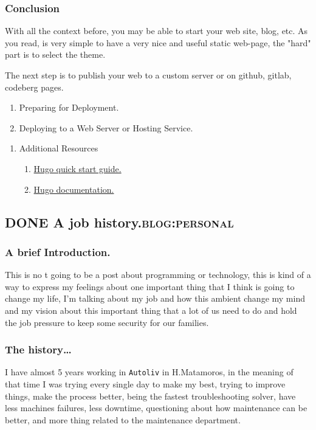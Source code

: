 \documentclass[11pt]{article}
\begin{document}
\subsubsection{Conclusion}
\label{sec:org67b39a6}
With all the context before, you may be able to start your web site, blog, etc. As you read, is very simple to have a very nice and useful static web-page, the "hard" part is to select the theme.

The next step is to publish your web to a custom server or on github, gitlab, codeberg pages.
\begin{enumerate}
\item Preparing for Deployment.
\item Deploying to a Web Server or Hosting Service.
\end{enumerate}
\begin{enumerate}
\item Additional Resources
\label{sec:orgf3ee645}
\begin{enumerate}
\item \href{https://gohugo.io/getting-started/quick-start/}{Hugo quick start guide.}
\item \href{https://gohugo.io/documentation/}{Hugo documentation.}
\end{enumerate}
\end{enumerate}
\subsection{{\bfseries\sffamily DONE} A job history.\hfill{}\textsc{blog:personal}}
\label{sec:org2ac081b}
\subsubsection{A brief Introduction.}
\label{sec:org25ce1bc}
This is no t going to be a post about programming or technology, this is kind of a way to express my feelings about one important thing that I think is going to change my life, I'm talking about my job and how this ambient change my mind and my vision about this important thing that a lot of us need to do and hold the job pressure to keep some security for our families.
\subsubsection{The history\ldots{}}
\label{sec:org006b20b}
I have almost 5 years working in \texttt{Autoliv} in H.Matamoros, in the meaning of that time I was trying every single day to make my best, trying to improve things, make the process better, being the fastest troubleshooting solver, have less machines failures, less downtime, questioning about how maintenance can be better, and more thing related to the maintenance department.
\end{document}
